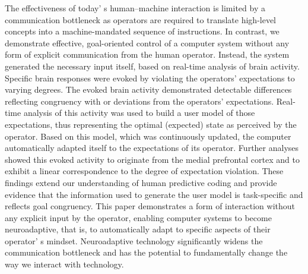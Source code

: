 \abstract%
The effectiveness of today' s human–machine interaction is limited by a communication bottleneck as operators are required to translate high-level concepts into a machine-mandated sequence of instructions. In contrast, we demonstrate effective, goal-oriented control of a computer system without any form of explicit communication from the human operator. Instead, the system generated the necessary input itself, based on real-time analysis of brain activity. Specific brain responses were evoked by violating the operators' expectations to varying degrees. The evoked brain activity demonstrated detectable differences reflecting congruency with or deviations from the operators' expectations. Real-time analysis of this activity was used to build a user model of those expectations, thus representing the optimal (expected) state as perceived by the operator. Based on this model, which was continuously updated, the computer automatically adapted itself to the expectations of its operator. Further analyses showed this evoked activity to originate from the medial prefrontal cortex and to exhibit a linear correspondence to the degree of expectation violation. These findings extend our understanding of human predictive coding and provide evidence that the information used to generate the user model is task-specific and reflects goal congruency. This paper demonstrates a form of interaction without any explicit input by the operator, enabling computer systems to become neuroadaptive, that is, to automatically adapt to specific aspects of their operator' s mindset. Neuroadaptive technology significantly widens the communication bottleneck and has the potential to fundamentally change the way we interact with technology.


\clearpage


\pagestyle{nat}


